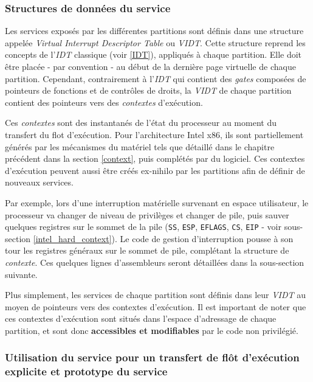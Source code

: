	\subsubsection{Structures de données du service}

Les services exposés par les différentes partitions sont définis dans une structure appelée \emph{Virtual Interrupt Descriptor Table} ou \emph{VIDT}. Cette structure reprend les concepts de l'\emph{IDT} classique (voir \ref{IDT}), appliqués à chaque partition. Elle doit être placée - par convention - au début de la dernière page virtuelle de chaque partition. Cependant, contrairement à l'\emph{IDT} qui contient des \emph{gates} composées de pointeurs de fonctions et de contrôles de droits, la \emph{VIDT} de chaque partition contient des pointeurs vers des \emph{contextes} d'exécution.

Ces \emph{contextes} sont des instantanés de l'état du processeur au moment du transfert du flot d'exécution. Pour l'architecture Intel x86, ils sont partiellement générés par les mécanismes du matériel tels que détaillé dans le chapitre précédent dans la section \ref{context}, puis complétés par du logiciel. Ces contextes d'exécution peuvent aussi être créés ex-nihilo par les partitions afin de définir de nouveaux services.

Par exemple, lors d'une interruption matérielle survenant en espace utilisateur, le processeur va changer de niveau de privilèges et changer de pile, puis sauver quelques registres sur le sommet de la pile (\texttt{SS}, \texttt{ESP}, \texttt{EFLAGS}, \texttt{CS}, \texttt{EIP} - voir sous-section \ref{intel_hard_context}). Le code de gestion d'interruption pousse à son tour les registres généraux sur le sommet de pile, complétant la structure de \emph{contexte}. Ces quelques lignes d'assembleurs seront détaillées dans la sous-section suivante.

Plus simplement, les services de chaque partition sont définis dans leur \emph{VIDT} au moyen de pointeurs vers des contextes d'exécution. Il est important de noter que ces contextes d'exécution sont situés dans l'espace d'adressage de chaque partition, et sont donc \textbf{accessibles et modifiables} par le code non privilégié.

	\subsubsection{Utilisation du service pour un transfert de flôt d'exécution explicite et prototype du service}

